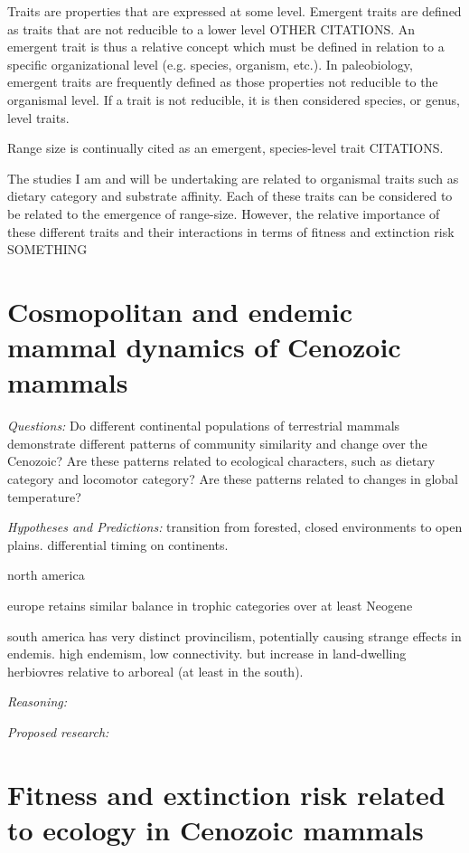 \documentclass[12pt,letterpaper]{article}
\begin{document}
Traits are properties that are expressed at some level. Emergent traits are defined as traits that are not reducible to a lower level \citep{Jablonski2008a}OTHER CITATIONS. An emergent trait is thus a relative concept which must be defined in relation to a specific organizational level (e.g. species, organism, etc.). In paleobiology, emergent traits are frequently defined as those properties not reducible to the organismal level. If a trait is not reducible, it is then considered species, or genus, level traits.

Range size is continually cited as an emergent, species-level trait CITATIONS. 

The studies I am and will be undertaking are related to organismal traits such as dietary category and substrate affinity. Each of these traits can be considered to be related to the emergence of range-size. However, the relative importance of these different traits and their interactions in terms of fitness and extinction risk SOMETHING


\section{Cosmopolitan and endemic mammal dynamics of Cenozoic mammals}

\textit{Questions:} Do different continental populations of terrestrial mammals demonstrate different patterns of community similarity and change over the Cenozoic? Are these patterns related to ecological characters, such as dietary category and locomotor category? Are these patterns related to changes in global temperature?

\textit{Hypotheses and Predictions:}
transition from forested, closed environments to open plains. differential timing on continents.

north america

europe retains similar balance in trophic categories over at least Neogene

south america has very distinct provincilism, potentially causing strange effects in endemis. high endemism, low connectivity. but increase in land-dwelling herbiovres relative to arboreal (at least in the south).

\textit{Reasoning:}

\textit{Proposed research:}


\section{Fitness and extinction risk related to ecology in Cenozoic mammals}
\end{document}
